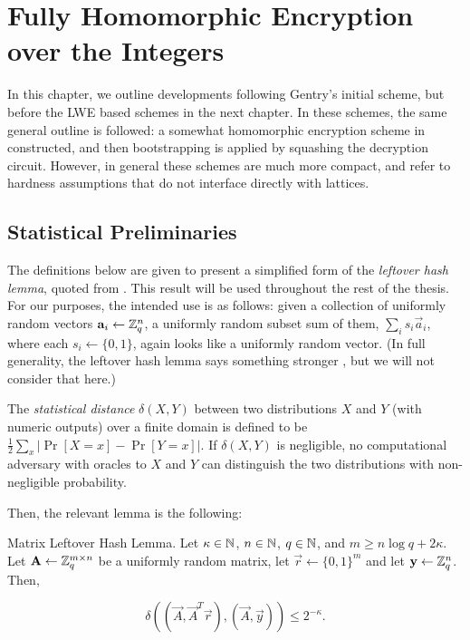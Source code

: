 

\chapter{Fully Homomorphic Encryption over the Integers} \label{chap:dghvchap}
In this chapter, we outline developments following Gentry's initial scheme, but before the LWE based schemes in the next chapter. In these schemes, the same general outline is followed: a somewhat homomorphic encryption scheme in constructed, and then bootstrapping is applied by squashing the decryption circuit. However, in general these schemes are much more compact, and refer to hardness assumptions that do not interface directly with lattices.


\section{Statistical Preliminaries}
\label{sec:statprelim}
The definitions below are given to present a simplified form of the \emph{leftover hash lemma}, quoted from \cite{ILL}. This result will be used throughout the rest of the thesis. For our purposes, the intended use is as follows: given a collection of uniformly random vectors $\mathbf{a}_i \leftarrow \mathbb{Z}_q^n$, a uniformly random subset sum of them, $\sum_i s_i \vec{a}_i$, where each $s_i \leftarrow \{0,1\}$, again looks like a uniformly random vector. (In full generality, the leftover hash lemma says something stronger \cite{haastad1999pseudorandom}, but we will not consider that here.)

The \emph{statistical distance} $\delta(X, Y)$ between two distributions $X$ and $Y$ (with numeric outputs) over a finite domain is defined to be $\frac{1}{2} \sum_x \left| \Pr[X = x] - \Pr[Y = x] \right|$. If $\delta(X, Y)$ is negligible, no computational adversary with oracles to $X$ and $Y$ can distinguish the two distributions with non-negligible probability.

Then, the relevant lemma is the following:
\begin{lemma}{Matrix Leftover Hash Lemma.}
    Let $\kappa \in \mathbb{N}$, $n \in \mathbb{N}$, $q \in \mathbb{N}$, and $m \geq n \log q + 2 \kappa$. Let $\mathbf{A} \leftarrow \mathbb{Z}_q^{m \times n}$ be a uniformly random matrix, let $\vec{r} \leftarrow \{0,1\}^m$ and let $\mathbf{y} \leftarrow \mathbb{Z}_q^n$. Then,

    \[\delta((\vec{A}, \vec{A}^T\vec{r}), (\vec{A}, \vec{y})) \leq 2^{-\kappa}.\]
\end{lemma}


